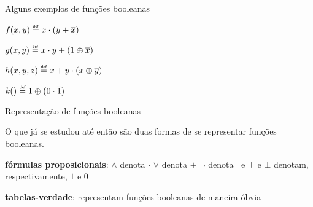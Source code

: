\expandafter\documentclass\expandafter[table, usenames, svgnames, dvipsnames,14pt, \classopts]{beamer}
\newcommand\defeq{\mathrel{\overset{\makebox[0pt]{\mbox{\normalfont\tiny\sffamily def}}}{=}}}
\begin{document}
\begin{frame}{Alguns exemplos de funções booleanas}

    \begin{outline}[enumerate]
        \1 $f(x,y) \defeq x \cdot (y + \overline{x})$
            
        \vspace{1em}
            
        \1 $g(x,y) \defeq x \cdot y + (1 \oplus \overline{x})$

        \vspace{1em}

        \1 $h(x,y,z) \defeq x + y \cdot (x \oplus \overline{y})$

        \vspace{1em}

        \1 $k() \defeq 1 \oplus (0 \cdot \overline{1})$
    \end{outline}        

\end{frame}

\begin{frame}{Representação de funções booleanas}

    O que já se estudou até então são duas formas de se representar funções booleanas.

    \begin{outline}
        \1 \textbf{fórmulas proposicionais}:
            \2[-] $\land$ denota $\cdot$
            \2[-] $\lor$ denota $+$
            \2[-] $\lnot$ denota $\bar{~}$
            \2[-] e $\top$ e $\bot$ denotam, respectivamente, $1$ e $0$
        
        \vspace{1em}
        
        \1 \textbf{tabelas-verdade}: representam funções booleanas de maneira óbvia
    \end{outline}        
            
\end{frame}
\end{document}
